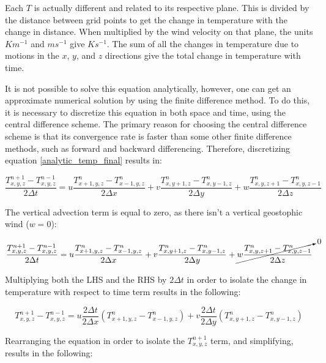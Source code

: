 Each $T$ is actually different and related to its respective plane. This is divided by the distance between grid points to get the change in temperature with the change in distance. When multiplied by the wind velocity on that plane, the units $K m^{-1}$ and $m s^{-1}$ give $K s^{-1}$. The sum of all the changes in temperature due to motions in the $x$, $y$, and $z$ directions give the total change in temperature with time\cite{primitive_equations}.

It is not possible to solve this equation analytically, however, one can get an approximate numerical solution by using the finite difference method. To do this, it is necessary to discretize this equation in both space and time, using the central difference scheme. The primary reason for choosing the central difference scheme is that its convergence rate is faster than some other finite difference methods, such as forward and backward differencing. Therefore, discretizing equation \ref{analytic_temp_final} results in:

\begin{equation}
    \frac{T^{n + 1}_{x, y, z} - T^{n - 1}_{x, y, z}}{2 \Delta t} = u \frac{T^{n}_{x+1, y, z} - T^{n}_{x-1, y, z}}{2 \Delta x} + v \frac{T^{n}_{x, y+1, z} - T^{n}_{x, y-1, z}}{2 \Delta y} + w \frac{T^{n}_{x, y, z+1} - T^{n}_{x, y, z-1}}{2 \Delta z}
\end{equation}

The vertical advection term is equal to zero, as there isn't a vertical geostophic wind ($w = 0$):

\begin{equation}
    \frac{T^{n + 1}_{x, y, z} - T^{n - 1}_{x, y, z}}{2 \Delta t} = u \frac{T^{n}_{x+1, y, z} - T^{n}_{x-1, y, z}}{2 \Delta x} + v \frac{T^{n}_{x, y+1, z} - T^{n}_{x, y-1, z}}{2 \Delta y} + \cancelto{0}{w \frac{T^{n}_{x, y, z+1} - T^{n}_{x, y, z-1}}{2 \Delta z}}
\end{equation}

Multiplying both the LHS and the RHS by $2 \Delta t$ in order to isolate the change in temperature with respect to time term results in the following:

\begin{equation}
     T^{n + 1}_{x, y, z} - T^{n - 1}_{x, y, z} = u \frac{2 \Delta t}{2 \Delta x} (T^{n}_{x+1, y, z} - T^{n}_{x-1, y, z}) + v \frac{2 \Delta t}{2 \Delta y} (T^{n}_{x, y+1, z} - T^{n}_{x, y-1, z})
\end{equation}

Rearranging the equation in order to isolate the $T^{n + 1}_{x, y, z}$ term, and simplifying, results in the following: 

